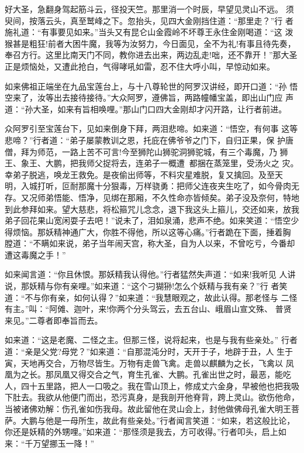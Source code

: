 好大圣，急翻身驾起筋斗云，径投天竺。那里消一个时辰，早望见灵山不远。
须臾间，按落云头，真至鹫峰之下。忽抬头，见四大金刚挡住道：“那里走？”行
者施礼道：“有事要见如来。”当头又有昆仑山金霞岭不坏尊王永住金刚喝道：“这
泼猴甚是粗狂!前者大困牛魔，我等为汝努力，今日面见，全不为礼!有事且待先奏，
奉召方行。这里比南天门不同，教你进去出来，两边乱走!咄，还不靠开！”那大圣
正是烦恼处，又遭此抢白，气得哮吼如雷，忍不住大呼小叫，早惊动如来。

如来佛祖正端坐在九品宝莲台上，与十八尊轮世的阿罗汉讲经，即开口道：“孙
悟空来了，汝等出去接待接待。”大众阿罗，遵佛旨，两路幢幡宝盖，即出山门应
声道：“孙大圣，如来有旨相唤哩。”那山门口四大金刚却才闪开路，让行者前进。

众阿罗引至宝莲台下，见如来倒身下拜，两泪悲啼。如来道：“悟空，有何事
这等悲啼？”行者道：“弟子屡蒙教训之恩，托庇在佛爷爷之门下，自归正果，保
护唐僧，拜为师范，一路上苦不可言!今至狮陀山狮驼洞狮驼城，有三个毒魔，乃
狮王、象王、大鹏，把我师父捉将去，连弟子一概遭，都捆在蒸笼里，受汤火之
灾。幸弟子脱逃，唤龙王救免。是夜偷出师等，不料灾星难脱，复又擒回。及至天
明，入城打听，叵耐那魔十分狠毒，万样骁勇：把师父连夜夹生吃了，如今骨肉无
存。又况师弟悟能、悟净，见绑在那厢，不久性命亦皆倾矣。弟子没及奈何，特地
到此参拜如来。望大慈悲，将松箍咒儿念念，退下我这头上箍儿，交还如来，放我
弟子回花果山宽闲耍子去吧！”说未了，泪如泉涌，悲声不绝。如来笑道：“悟空少
得烦恼。那妖精神通广大，你胜不得他，所以这等心痛。”行者跪在下面，捶着胸
膛道：“不瞒如来说，弟子当年闹天宫，称大圣，自为人以来，不曾吃亏，今番却
遭这毒魔之手！”

如来闻言道：“你且休恨。那妖精我认得他。”行者猛然失声道：“如来!我听见
人讲说，那妖精与你有亲哩。”如来道：“这个刁猢狲!怎么个妖精与我有亲？”行
者笑道：“不与你有亲，如何认得？”如来道：“我慧眼观之，故此认得。那老怪与
二怪有主。”叫：“阿傩、迦叶，来!你两个分头驾云，去五台山、峨眉山宣文殊、
普贤来见。”二尊者即奉旨而去。

如来道：“这是老魔、二怪之主。但那三怪，说将起来，也是与我有些亲处。”
行者道：“亲是父党?母党？”如来道：“自那混沌分时，天开于子，地辟于丑，人
生于寅，天地再交合，万物尽皆生。万物有走兽飞禽。走兽以麒麟为之长，飞禽以
凤凰为之长。那凤凰又得交合之气，育生孔雀、大鹏。孔雀出世之时，最恶，能吃
人，四十五里路，把人一口吸之。我在雪山顶上，修成丈六金身，早被他也把我吸
下肚去。我欲从他便门而出，恐污真身，是我剖开他脊背，跨上灵山。欲伤他命，
当被诸佛劝解：伤孔雀如伤我母。故此留他在灵山会上，封他做佛母孔雀大明王菩
萨。大鹏与他是一母所生，故此有些亲处。”行者闻言笑道：“如来，若这般比论，
你还是妖精的外甥哩。”如来道：“那怪须是我去，方可收得。”行者叩头，启上如
来：“千万望挪玉一降！”

